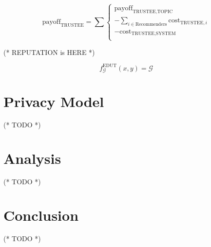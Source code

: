 \documentclass{article}
\begin{document}
\begin{equation}
\text{payoff}_{\text{TRUSTEE}}=\sum \left\{
\begin{array}{c}
 \text{payoff}_{\text{TRUSTEE},\text{TOPIC}} \\
 -\sum _{i\in \text{Recommenders}} \text{cost}_{\text{TRUSTEE},i} \\
 -\text{cost}_{\text{TRUSTEE},\text{SYSTEM}} \\
\end{array}
\right.
\end{equation}

(* REPUTATION is HERE *)

\begin{equation}
f_{\mathcal{G}}^{\text{EDUT}}(x,y)=\mathcal{G}
\end{equation}


\section{Privacy Model}

(* TODO *)


\section{Analysis}

(* TODO *)


\section{Conclusion}

(* TODO *)
\end{document}
